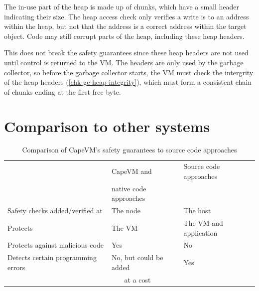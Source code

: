 The in-use part of the heap is made up of chunks, which have a small header indicating their size. The heap access check only verifies a write is to an address within the heap, but not that the address is a correct address within the target object. Code may still corrupt parts of the heap, including these heap headers.

This does not break the safety guarantees since these heap headers are not used until control is returned to the VM. The headers are only used by the garbage collector, so before the garbage collector starts, the VM must check the intergrity of the heap headers (\ref{chk-gc-heap-integrity}), which must form a consistent chain of chunks ending at the first free byte.



\section{Comparison to other systems}

\begin{table}
\caption{Comparison of CapeVM's safety guarantees to source code approaches}
\label{tbl-safety-comparison-source-code-approaches}
    \begin{tabular}{p{}p{}p{}} %
    \toprule
                                                & CapeVM and                                  & Source code approaches \\
                                                & native code approaches                      & \\
    \midrule
    \midrule
    Safety checks added/verified at             & The node                                    & The host \\
    Protects                                    & The VM                                      & The VM and application \\
    Protects against malicious code             & Yes                                         & No \\
    Detects certain programming errors          & No, but could be added                      & Yes \\
                                                & ~~~ at a cost                               & \\
    \bottomrule
    \end{tabular}
\end{table}

